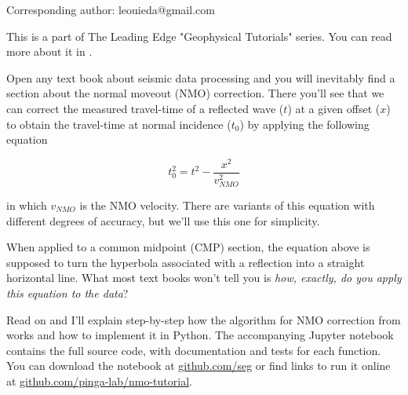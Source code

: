 Corresponding author: leouieda@gmail.com

This is a part of The Leading Edge "Geophysical Tutorials" series.
You can read more about it in \citet{Hall_2016a}.

Open any text book about seismic data processing and you will inevitably find a
section about the normal moveout (NMO) correction.
There you'll see that we can correct the measured travel-time of a reflected
wave ($t$) at a given offset ($x$) to obtain the travel-time at normal
incidence ($t_0$) by applying the following equation 

\begin{equation}
t_0^2=t^2-\dfrac{x^2}{v_{NMO}^2}
\label{eq:traveltime}
\end{equation}

in which $v_{NMO}$ is the NMO velocity.
There are variants of this equation with different degrees of accuracy, 
but we'll use this one for simplicity.

When applied to a common midpoint (CMP) section, the equation above is
supposed to turn the hyperbola associated with a reflection into a straight
horizontal line.
What most text books won't tell you is \textit{how, exactly, do you apply this
equation to the data}?

Read on and I'll explain step-by-step how the algorithm for NMO correction from
\citet{Yilmaz_2001} works and how to implement it in Python.
The accompanying Jupyter notebook \citep{Perez_2007} contains the full source
code, with documentation and tests for each function.
You can download the notebook at
\href{https://github.com/seg}{github.com/seg} or
find links to run it online at
\href{https://github.com/pinga-lab/nmo-tutorial}{github.com/pinga-lab/nmo-tutorial}.

